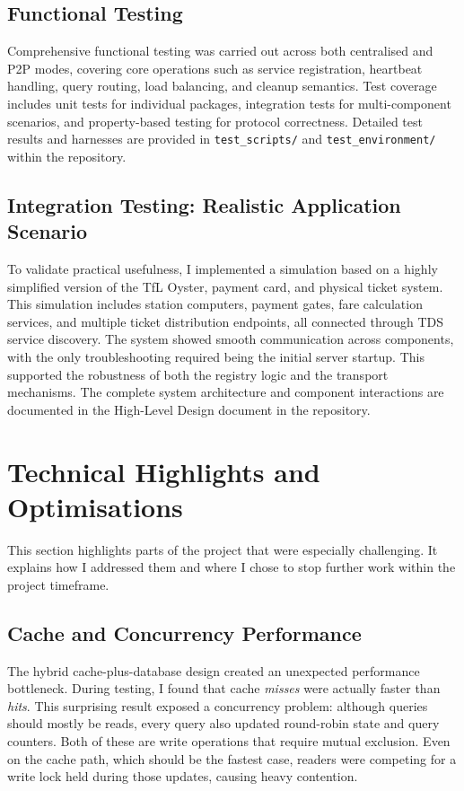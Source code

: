 \documentclass[10pt,a4paper]{article}
\begin{document}
\subsection{Functional Testing}

Comprehensive functional testing was carried out across both centralised and P2P modes, covering core operations such as service registration, heartbeat handling, query routing, load balancing, and cleanup semantics. Test coverage includes unit tests for individual packages, integration tests for multi-component scenarios, and property-based testing for protocol correctness. Detailed test results and harnesses are provided in \texttt{test\_scripts/} and \texttt{test\_environment/} within the repository.

\subsection{Integration Testing: Realistic Application Scenario}

To validate practical usefulness, I implemented a simulation based on a highly simplified version of the TfL Oyster, payment card, and physical ticket system. This simulation includes station computers, payment gates, fare calculation services, and multiple ticket distribution endpoints, all connected through TDS service discovery. The system showed smooth communication across components, with the only troubleshooting required being the initial server startup. This supported the robustness of both the registry logic and the transport mechanisms. The complete system architecture and component interactions are documented in the High-Level Design document in the repository.

\section{Technical Highlights and Optimisations}
This section highlights parts of the project that were especially challenging. It explains how I addressed them and where I chose to stop further work within the project timeframe.
\subsection{Cache and Concurrency Performance}
The hybrid cache-plus-database design created an unexpected performance bottleneck. During testing, I found that cache \emph{misses} were actually faster than \emph{hits}. This surprising result exposed a concurrency problem: although queries should mostly be reads, every query also updated round-robin state and query counters. Both of these are write operations that require mutual exclusion. Even on the cache path, which should be the fastest case, readers were competing for a write lock held during those updates, causing heavy contention.
\end{document}
